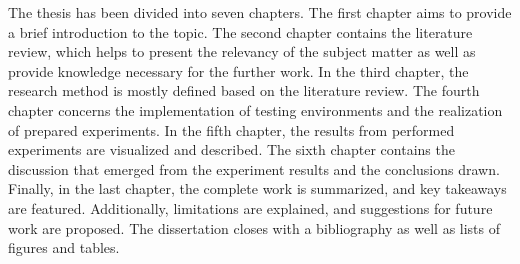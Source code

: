 The thesis has been divided into seven chapters. The first chapter aims to provide a brief introduction to the topic. The second chapter contains the literature review, which helps to present the relevancy of the subject matter as well as provide knowledge necessary for the further work. In the third chapter, the research method is mostly defined based on the literature review. The fourth chapter concerns the implementation of testing environments and the realization of prepared experiments. In the fifth chapter, the results from performed experiments are visualized and described. The sixth chapter contains the discussion that emerged from the experiment results and the conclusions drawn. Finally, in the last chapter, the complete work is summarized, and key takeaways are featured. Additionally, limitations are explained, and suggestions for future work are proposed. The dissertation closes with a bibliography as well as lists of figures and tables.
\clearpage
